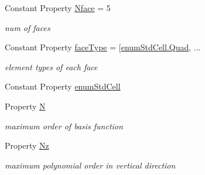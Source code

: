 \begin{DoxyCompactItemize}
Constant Property \hyperlink{class_std_prism_tri_ad1dae3ee364c0f6f639560c7089ed73a}{Nface} = 5
\begin{DoxyCompactList}\small\item\em num of faces \end{DoxyCompactList}\item 
Constant Property \hyperlink{class_std_prism_tri_a51231d155c3ba8a0c673165b3246927b}{face\+Type} = \mbox{[}\hyperlink{classenum_std_cell_ac4c2fa4e189e76e103f3ff9b1d19b9e7a79d1c44e78bdfebfd755a724f5e04029}{enum\+Std\+Cell.\+Quad}, ...
\begin{DoxyCompactList}\small\item\em element types of each face \end{DoxyCompactList}\item 
Constant Property \hyperlink{class_std_prism_tri_a22f8f05a0e485040d28adc1385258039}{enum\+Std\+Cell}
\item 
Property \hyperlink{class_std_prism_tri_ae66dea60d79b3eea15b9be2c1892d784}{N}
\begin{DoxyCompactList}\small\item\em maximum order of basis function \end{DoxyCompactList}\item 
Property \hyperlink{class_std_prism_tri_a6d9a746cf2d10610a759d8a3dce6f8e7}{Nz}
\begin{DoxyCompactList}\small\item\em maximum polynomial order in vertical direction \end{DoxyCompactList}\end{DoxyCompactItemize}
